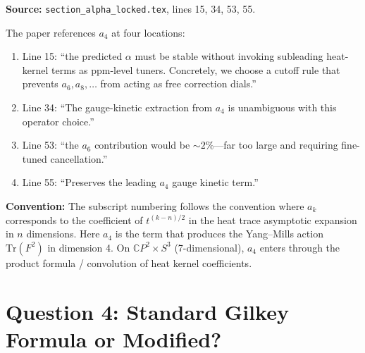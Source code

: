 \documentclass[12pt,a4paper]{article}
\begin{document}
\begin{tcolorbox}[colback=yellow!5!white, colframe=yellow!50!black,
  title=Answer: $a_4$ (the fourth Seeley--DeWitt coefficient)]

\textbf{Source:} \texttt{section\_alpha\_locked.tex}, lines 15, 34, 53, 55.

The paper references $a_4$ at four locations:
\begin{enumerate}
\item Line 15: ``the predicted $\alpha$ must be stable without invoking
  subleading heat-kernel terms as ppm-level tuners.  Concretely, we choose
  a cutoff rule that prevents $a_6, a_8, \ldots$ from acting as free
  correction dials.''
\item Line 34: ``The gauge-kinetic extraction from $a_4$ is unambiguous
  with this operator choice.''
\item Line 53: ``the $a_6$ contribution would be $\sim 2\%$---far too
  large and requiring fine-tuned cancellation.''
\item Line 55: ``Preserves the leading $a_4$ gauge kinetic term.''
\end{enumerate}

\textbf{Convention:} The subscript numbering follows the convention where
$a_k$ corresponds to the coefficient of $t^{(k-n)/2}$ in the heat trace
asymptotic expansion in $n$ dimensions.  Here $a_4$ is the term that
produces the Yang--Mills action $\mathrm{Tr}(F^2)$ in dimension 4.
On $\mathbb{C}P^2 \times S^3$ (7-dimensional), $a_4$ enters through
the product formula / convolution of heat kernel coefficients.
\end{tcolorbox}

\section{Question 4: Standard Gilkey Formula or Modified?}
\label{sec:q4}
\end{document}
